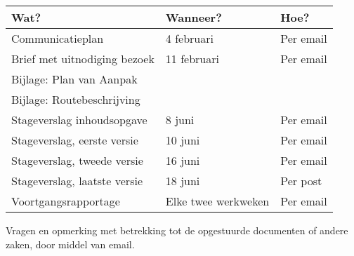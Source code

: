 \begin{tabularx}{\textwidth}{|X|l|l|}
\hline
Wat?&Wanneer?&Hoe?\\
\hline
Communicatieplan&4 februari&Per email\\
\hline
Brief met uitnodiging bezoek&11 februari&Per email\\
Bijlage: Plan van Aanpak&&\\
Bijlage: Routebeschrijving&&\\
\hline
Stageverslag inhoudsopgave&8 juni&Per email\\
\hline
Stageverslag, eerste versie&10 juni&Per email\\
\hline
Stageverslag, tweede versie&16 juni&Per email\\
\hline
Stageverslag, laatste versie&18 juni&Per post\\
\hline
Voortgangsrapportage&Elke twee werkweken&Per email\\
\hline
\end{tabularx}


Vragen en opmerking met betrekking tot de opgestuurde documenten of andere zaken, door middel van email.
